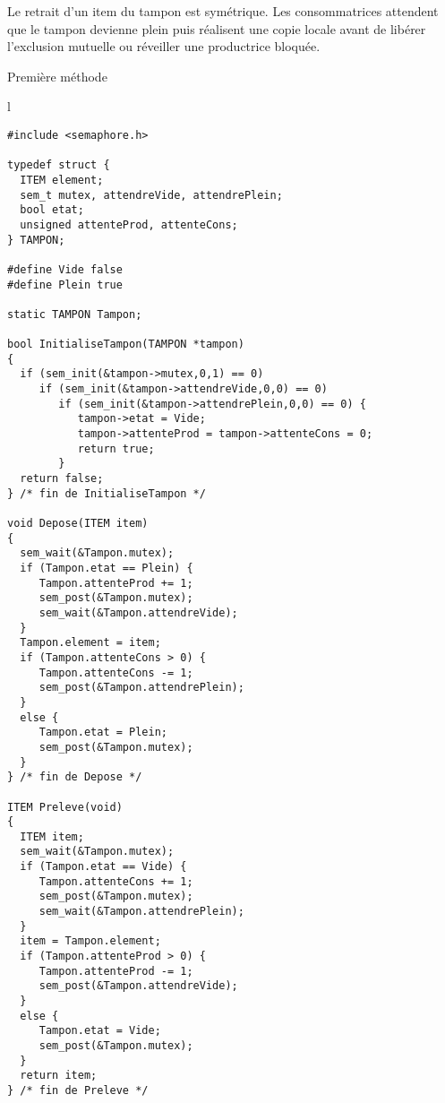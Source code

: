 Le retrait d'un item du tampon est symétrique. Les consommatrices attendent que le tampon devienne plein puis réalisent une copie locale avant de libérer l'exclusion mutuelle ou réveiller une productrice bloquée.
\begin{algorithm}[h!tp]
\caption{Première méthode}\label{prodcons:tampon1}
\begin{center}
\begin{tabular}{l}
\lstset{language=C++}
\begin{lstlisting}
#include <semaphore.h>

typedef struct {
  ITEM element;
  sem_t mutex, attendreVide, attendrePlein;
  bool etat;
  unsigned attenteProd, attenteCons;
} TAMPON;

#define Vide false
#define Plein true

static TAMPON Tampon;

bool InitialiseTampon(TAMPON *tampon)
{
  if (sem_init(&tampon->mutex,0,1) == 0)
     if (sem_init(&tampon->attendreVide,0,0) == 0)
        if (sem_init(&tampon->attendrePlein,0,0) == 0) {
           tampon->etat = Vide;
           tampon->attenteProd = tampon->attenteCons = 0;
           return true;
        }
  return false;
} /* fin de InitialiseTampon */

void Depose(ITEM item)
{
  sem_wait(&Tampon.mutex);
  if (Tampon.etat == Plein) {
     Tampon.attenteProd += 1;
     sem_post(&Tampon.mutex);
     sem_wait(&Tampon.attendreVide);
  }
  Tampon.element = item;
  if (Tampon.attenteCons > 0) {
     Tampon.attenteCons -= 1;
     sem_post(&Tampon.attendrePlein);
  }
  else {
     Tampon.etat = Plein;
     sem_post(&Tampon.mutex);
  }
} /* fin de Depose */

ITEM Preleve(void)
{
  ITEM item;
  sem_wait(&Tampon.mutex);
  if (Tampon.etat == Vide) {
     Tampon.attenteCons += 1;
     sem_post(&Tampon.mutex);
     sem_wait(&Tampon.attendrePlein);
  }
  item = Tampon.element;
  if (Tampon.attenteProd > 0) {
     Tampon.attenteProd -= 1;
     sem_post(&Tampon.attendreVide);
  }
  else {
     Tampon.etat = Vide;
     sem_post(&Tampon.mutex);
  }
  return item;
} /* fin de Preleve */
\end{lstlisting}
\end{tabular}
\end{center}
\end{algorithm}

